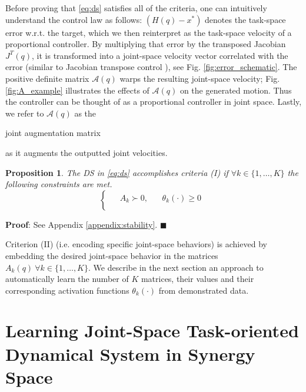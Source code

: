 \documentclass[letterpaper, 10 pt, conference,fleqn]{ieeeconf}
\begin{document}
Before proving that \eqref{eq:ds} satisfies all of the criteria, one can intuitively understand the control law as follows: $(H(q) - x^*)$ denotes the task-space error w.r.t. the target, which we then reinterpret as the task-space velocity of a proportional controller. By multiplying that error by the transposed Jacobian $J^T(q)$, it is transformed into a joint-space velocity vector correlated with the error (similar to Jacobian transpose control \cite{wolovich1984computational,sciavicco1988solution}), see Fig. \ref{fig:error_schematic}. The positive definite matrix $\mathcal{A}(q)$ warps the resulting joint-space velocity; Fig. \ref{fig:A_example} illustrates the effects of  $\mathcal{A}(q)$ on the generated motion. Thus the controller can be thought of as a proportional controller in joint space. Lastly, we refer to %
$\mathcal{A}(q)$ as the \begin{bf} joint augmentation matrix \end{bf} as it augments the outputted joint velocities.
\newtheorem{prop1}{Proposition}
\begin{prop1}
\label{prop:stability}
The DS in \eqref{eq:ds} accomplishes criteria (I) if $ \forall k \in \{1,\dots,K\}  $ the following constraints are met. 
\begin{equation}
\label{eq:first_criteria_stability}
\begin{cases}
\begin{split}
 & A_k \succ 0, & ~~~~ \theta_k(\cdot) \geq 0 \\
\end{split}
\end{cases}
\end{equation}    
\end{prop1}
\vspace{5pt}
\textbf{Proof}: See Appendix \ref{appendix:stability}. $\blacksquare$

Criterion (II) (i.e. encoding specific joint-space behaviors) is achieved by embedding the desired joint-space behavior in the matrices $A_k(q)~ \forall k \in\{1,\dots,K\}$. We describe in the next section an approach to automatically learn the number of $K$ matrices, their values and their corresponding activation functions $\theta_k(\cdot)$ from demonstrated data. 

\section{Learning \textbf{J}oint-Space \textbf{T}ask-oriented \textbf{D}ynamical \textbf{S}ystem in Synergy Space} 
\label{Sec:Learning}
\end{document}
